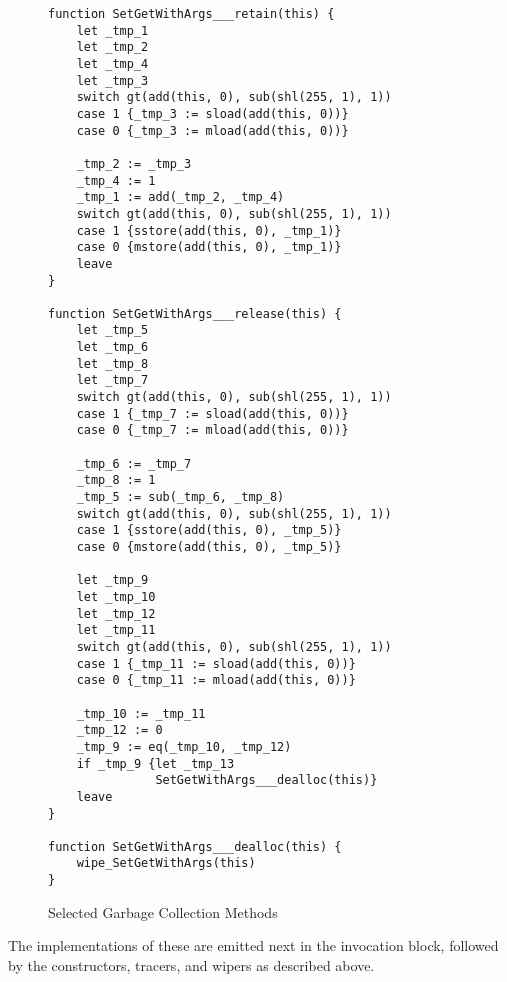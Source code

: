 \begin{figure}[hbtp]
    \caption{Selected Garbage Collection Methods}
    \label{code.9}
    \begin{lstlisting}[language=yul,frame=single]
function SetGetWithArgs___retain(this) {
    let _tmp_1
    let _tmp_2
    let _tmp_4
    let _tmp_3
    switch gt(add(this, 0), sub(shl(255, 1), 1))
    case 1 {_tmp_3 := sload(add(this, 0))}
    case 0 {_tmp_3 := mload(add(this, 0))}

    _tmp_2 := _tmp_3
    _tmp_4 := 1
    _tmp_1 := add(_tmp_2, _tmp_4)
    switch gt(add(this, 0), sub(shl(255, 1), 1))
    case 1 {sstore(add(this, 0), _tmp_1)}
    case 0 {mstore(add(this, 0), _tmp_1)}
    leave
}

function SetGetWithArgs___release(this) {
    let _tmp_5
    let _tmp_6
    let _tmp_8
    let _tmp_7
    switch gt(add(this, 0), sub(shl(255, 1), 1))
    case 1 {_tmp_7 := sload(add(this, 0))}
    case 0 {_tmp_7 := mload(add(this, 0))}

    _tmp_6 := _tmp_7
    _tmp_8 := 1
    _tmp_5 := sub(_tmp_6, _tmp_8)
    switch gt(add(this, 0), sub(shl(255, 1), 1))
    case 1 {sstore(add(this, 0), _tmp_5)}
    case 0 {mstore(add(this, 0), _tmp_5)}

    let _tmp_9
    let _tmp_10
    let _tmp_12
    let _tmp_11
    switch gt(add(this, 0), sub(shl(255, 1), 1))
    case 1 {_tmp_11 := sload(add(this, 0))}
    case 0 {_tmp_11 := mload(add(this, 0))}

    _tmp_10 := _tmp_11
    _tmp_12 := 0
    _tmp_9 := eq(_tmp_10, _tmp_12)
    if _tmp_9 {let _tmp_13
               SetGetWithArgs___dealloc(this)}
    leave
}

function SetGetWithArgs___dealloc(this) {
    wipe_SetGetWithArgs(this)
}

    \end{lstlisting}
\end{figure}

The implementations of these are emitted next in the invocation block,
followed by the constructors, tracers, and wipers as described above.
